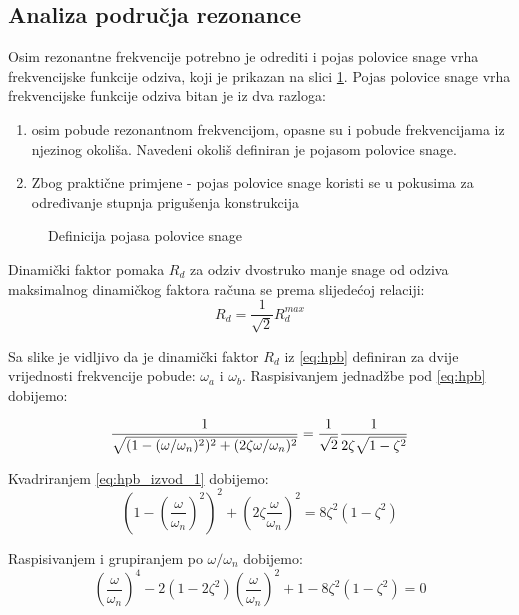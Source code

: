 \subsection{Analiza područja rezonance}
Osim rezonantne frekvencije potrebno je odrediti i pojas polovice snage vrha
frekvencijske funkcije odziva, koji je prikazan na slici \ref{fig:hpb}. Pojas polovice
snage vrha frekvencijske funkcije odziva bitan je iz dva razloga:
\begin{enumerate}
    \item osim pobude rezonantnom frekvencijom, opasne su i pobude frekvencijama iz
        njezinog okoliša. Navedeni okoliš definiran je pojasom polovice snage.
    \item Zbog praktične primjene - pojas polovice snage koristi se u pokusima
        za određivanje stupnja prigušenja konstrukcija
\end{enumerate}
\begin{figure}[H]
    
    \caption{Definicija pojasa polovice snage}
    \label{fig:hpb}
\end{figure}
Dinamički faktor pomaka $R_d$ za odziv dvostruko manje snage od odziva maksimalnog
dinamičkog faktora računa se prema slijedećoj relaciji:
\begin{equation}\label{eq:hpb}
    R_d = \frac{1}{\sqrt{2}}R_d^{max}
\end{equation}

Sa slike je vidljivo da je dinamički faktor $R_d$ iz \eqref{eq:hpb} definiran za
dvije vrijednosti frekvencije pobude: $\omega_a$ i $\omega_b$. Raspisivanjem
jednadžbe pod \eqref{eq:hpb} dobijemo:

\begin{equation}\label{eq:hpb_izvod_1}
        \frac{1}{\sqrt{(1-(\omega/\omega_n)^2)^2+(2\zeta\omega/\omega_n)^2}}=
            \frac{1}{\sqrt{2}}\frac{1}{2\zeta\sqrt{1-\zeta^2}}\\
\end{equation}

Kvadriranjem \eqref{eq:hpb_izvod_1} dobijemo:
\begin{equation}\label{eq:hpb_izvod_2}
    \left(1-\left(\frac{\omega}{\omega_n}\right)^2\right)^2
    +\left(2\zeta\frac{\omega}{\omega_n}\right)^2 =
    8\zeta^2(1-\zeta^2)
\end{equation}

Raspisivanjem i grupiranjem po $\omega/\omega_n$ dobijemo:
\begin{equation}\label{eq:hpb_izvod_3}
    \left(\frac{\omega}{\omega_n}\right)^4
    -2(1-2\zeta^2)\left(\frac{\omega}{\omega_n}\right)^2
    +1-8\zeta^2(1-\zeta^2)=0
\end{equation}


